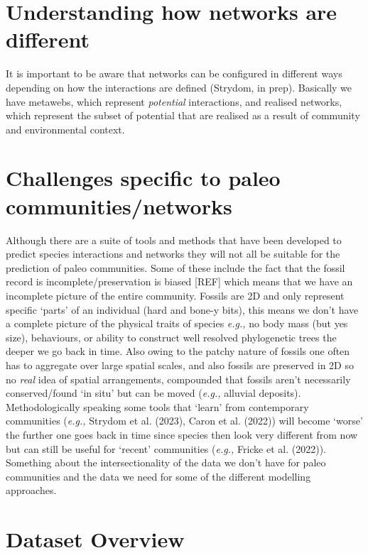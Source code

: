 \documentclass[
]{article}
\begin{document}
\section{Understanding how networks are
different}\label{understanding-how-networks-are-different}

It is important to be aware that networks can be configured in different
ways depending on how the interactions are defined (Strydom, in prep).
Basically we have metawebs, which represent \emph{potential}
interactions, and realised networks, which represent the subset of
potential that are realised as a result of community and environmental
context.

\section{Challenges specific to paleo
communities/networks}\label{challenges-specific-to-paleo-communitiesnetworks}

Although there are a suite of tools and methods that have been developed
to predict species interactions and networks they will not all be
suitable for the prediction of paleo communities. Some of these include
the fact that the fossil record is incomplete/preservation is biased
{[}REF{]} which means that we have an incomplete picture of the entire
community. Fossils are 2D and only represent specific `parts' of an
individual (hard and bone-y bits), this means we don't have a complete
picture of the physical traits of species \emph{e.g.,} no body mass (but
yes size), behaviours, or ability to construct well resolved
phylogenetic trees the deeper we go back in time. Also owing to the
patchy nature of fossils one often has to aggregate over large spatial
scales, and also fossils are preserved in 2D so no \emph{real} idea of
spatial arrangements, compounded that fossils aren't necessarily
conserved/found `in situ' but can be moved (\emph{e.g.,} alluvial
deposits). Methodologically speaking some tools that `learn' from
contemporary communities (\emph{e.g.,} Strydom et al. (2023), Caron et
al. (2022)) will become `worse' the further one goes back in time since
species then look very different from now but can still be useful for
`recent' communities (\emph{e.g.,} Fricke et al. (2022)). Something
about the intersectionality of the data we don't have for paleo
communities and the data we need for some of the different modelling
approaches.

\section{Dataset Overview}\label{dataset-overview}
\end{document}
